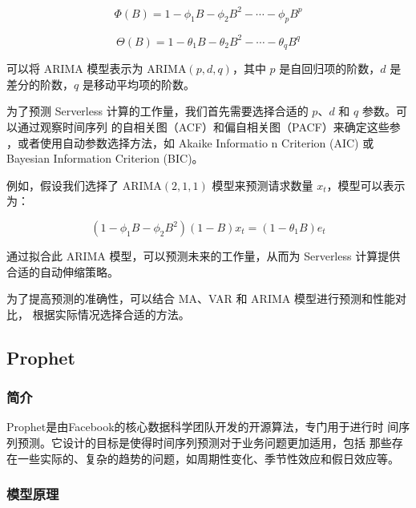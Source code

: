 \documentclass[a4paper,AutoFakeBold,oneside,12pt]{book}
\begin{document}
\begin{equation}
\Phi(B) = 1 - \phi_1 B - \phi_2 B^2 - \cdots - \phi_p B^p
\end{equation}

\begin{equation}
\Theta(B) = 1 - \theta_1 B - \theta_2 B^2 - \cdots - \theta_q B^q
\end{equation}

可以将 ARIMA 模型表示为 ARIMA$(p, d, q)$，其中 $p$ 是自回归项的阶数，$d$ 是差分的阶数，$q$ 是移动平均项的阶数。

为了预测 Serverless 计算的工作量，我们首先需要选择合适的
 $p$、$d$ 和 $q$ 参数。可以通过观察时间序列
 的自相关图（ACF）和偏自相关图（PACF）来确定这些参 \cite{hyndman_forecasting_2018}
 ，或者使用自动参数选择方法，如 Akaike Informatio
 n Criterion (AIC) 或 Bayesian Information Criterion (BIC)。

例如，假设我们选择了 ARIMA$(2, 1, 1)$ 模型来预测请求数量 $x_t$，模型可以表示为：

\begin{equation}
(1 - \phi_1 B - \phi_2 B^2)(1-B) x_t = (1 - \theta_1 B)e_t
\end{equation}

通过拟合此 ARIMA 模型，可以预测未来的工作量，从而为 Serverless 计算提供合适的自动伸缩策略。

为了提高预测的准确性，可以结合 MA、VAR 和 ARIMA 模型进行预测和性能对比，
根据实际情况选择合适的方法。

\subsection{Prophet}

\subsubsection{简介}

Prophet是由Facebook的核心数据科学团队开发的开源算法，专门用于进行时
间序列预测。它设计的目标是使得时间序列预测对于业务问题更加适用，包括
那些存在一些实际的、复杂的趋势的问题，如周期性变化、季节性效应和假日效应等。\cite{doi:10.1080/00031305.2017.1380080}

\subsubsection{模型原理}
\end{document}
